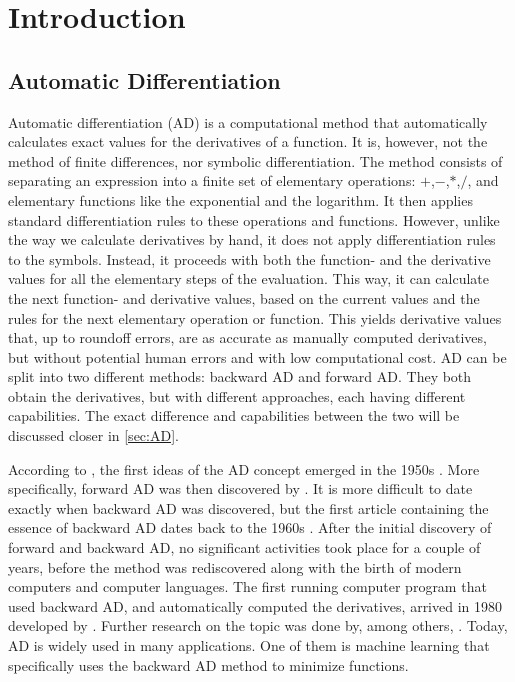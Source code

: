 \chapter{Introduction}
\section{Automatic Differentiation}
Automatic differentiation (AD) is a computational method that automatically calculates exact values for the derivatives of a function. It is, however, not the method of finite differences, nor symbolic differentiation. The method consists of separating an expression into a finite set of elementary operations: $+$,$-$,$*$,$/$, and elementary functions like the exponential and the logarithm. It then applies standard differentiation rules to these operations and functions. However, unlike the way we calculate derivatives by hand, it does not apply differentiation rules to the symbols. Instead, it proceeds with both the function- and the derivative values for all the elementary steps of the evaluation. This way, it can calculate the next function- and derivative values, based on the current values and the rules for the next elementary operation or function. This yields derivative values that, up to roundoff errors, are as accurate as manually computed derivatives, but without potential human errors and with low computational cost. AD can be split into two different methods: backward AD and forward AD. They both obtain the derivatives, but with different approaches, each having different capabilities. The exact difference and capabilities between the two will be discussed closer in \autoref{sec:AD}. 

According to \emph{\cite{SurveyAD}}, the first ideas of the AD concept emerged in the 1950s \emph{\citep{nolan1953analytical, beda1959programs}}. More specifically, forward AD was then discovered by \emph{\citet{wengert1964simple}}. It is more difficult to date exactly when backward AD was discovered, but the first article containing the essence of backward AD dates back to the 1960s \emph{\citep{boltyanskii1960theory}}. After the initial discovery of forward and backward AD, no significant activities took place for a couple of years, before the method was rediscovered along with the birth of modern computers and computer languages. The first running computer program that used backward AD, and automatically computed the derivatives, arrived in 1980 developed by \emph{\citet{speelpenning1980compiling}}. Further research on the topic was done by, among others, \emph{\citet{griewank1989automatic}}. Today, AD is widely used in many applications. One of them is machine learning that specifically uses the backward AD method to minimize functions. 

